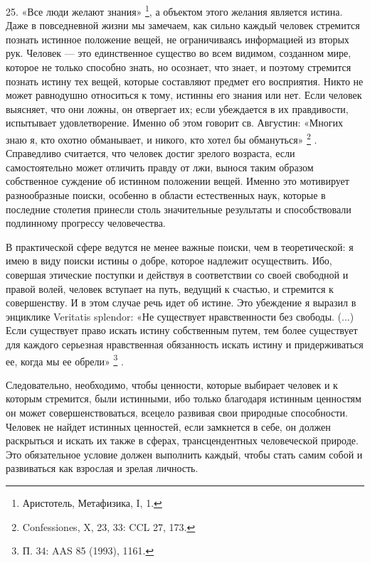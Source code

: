 \documentclass[a5paper,10pt]{article}
\begin{document}
25. «Все люди желают знания» \footnote{Аристотель, Метафизика, I, 1.}, а
объектом этого желания является истина. Даже в повседневной жизни мы замечаем,
как сильно каждый человек стремится познать истинное положение вещей, не
ограничиваясь информацией из вторых рук. Человек — это единственное существо во
всем видимом, созданном мире, которое не только способно знать, но осознает,
что знает, и поэтому стремится познать истину тех вещей, которые составляют
предмет его восприятия. Никто не может равнодушно относиться к тому, истинны
его знания или нет. Если человек выясняет, что они ложны, он отвергает их; если
убеждается в их правдивости, испытывает удовлетворение. Именно об этом говорит
св. Августин: «Многих знаю я, кто охотно обманывает, и никого, кто хотел бы
обмануться» \footnote{Confessiones, X, 23, 33: CCL 27, 173.} . Справедливо
считается, что человек достиг зрелого возраста, если самостоятельно может
отличить правду от лжи, вынося таким образом собственное суждение об истинном
положении вещей.  Именно это мотивирует разнообразные поиски, особенно в
области естественных наук, которые в последние столетия принесли столь
значительные результаты и способствовали подлинному прогрессу человечества.

В практической сфере ведутся не менее важные поиски, чем в теоретической: я
имею в виду поиски истины о добре, которое надлежит осуществить. Ибо, совершая
этические поступки и действуя в соответствии со своей свободной и правой волей,
человек вступает на путь, ведущий к счастью, и стремится к совершенству. И в
этом случае речь идет об истине. Это убеждение я выразил в энциклике Veritatis
splendor: «Не существует нравственности без свободы. (...) Если существует
право искать истину собственным путем, тем более существует для каждого
серьезная нравственная обязанность искать истину и придерживаться ее, когда мы
ее обрели» \footnote{П.  34: AAS 85 (1993), 1161.} .

Следовательно, необходимо, чтобы ценности, которые выбирает человек и к которым
стремится, были истинными, ибо только благодаря истинным ценностям он может
совершенствоваться, всецело развивая свои природные способности. Человек не
найдет истинных ценностей, если замкнется в себе, он должен раскрыться и искать
их также в сферах, трансцендентных человеческой природе. Это обязательное
условие должен выполнить каждый, чтобы стать самим собой и развиваться как
взрослая и зрелая личность.
\end{document}
